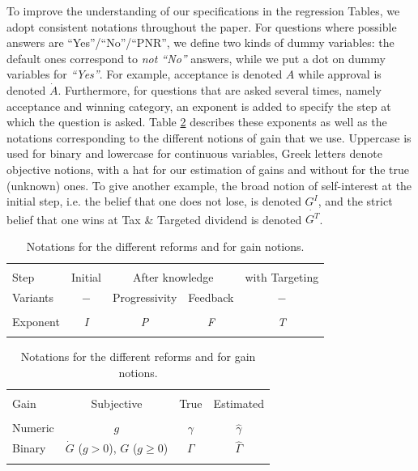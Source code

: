 \documentclass[11pt]{article}
\begin{document}
To improve the understanding of our specifications in the regression Tables, we adopt consistent notations throughout the paper. For questions where possible answers are ``Yes''/``No''/``PNR'', we define two kinds of dummy variables: the default ones correspond to \textit{not ``No''} answers, while we put a dot on dummy variables for \textit{``Yes''}. For example, acceptance is denoted $A$ while approval is denoted $\dot{A}$. Furthermore, for questions that are asked several times, namely acceptance and winning category, an exponent is added to specify the step at which the question is asked. Table \ref{tab:notations} describes these exponents as well as the notations corresponding to the different notions of gain that we use. Uppercase is used for binary and lowercase for continuous variables, Greek letters denote objective notions, with a hat for our estimation of gains and without for the true (unknown) ones. To give another example, the broad notion of self-interest at the initial step, i.e. the belief that one does not lose, is denoted $G^I$, and the strict belief that one wins at Tax \& Targeted dividend is denoted $\dot{G^T}$.


\begin{table}[H]
\caption{Notations for the different reforms and for gain notions.}
\label{tab:notations}

\centering \begin{tabular}{lcccc}
\\[-1.8ex]\hline 
\hline\\[-2.6ex] Step & Initial & \multicolumn{2}{c}{After knowledge} & with Targeting\tabularnewline

Variants & $-$ & Progressivity & Feedback & $-$\tabularnewline
 \hline \\[-2.3ex] 
Exponent & \emph{I} & \emph{P} & \emph{F} & \emph{T} \\ 
\hline 
\hline \\[-1.8ex] 
\end{tabular}

\medskip

\centering \begin{tabular}{lccc}
\\[-1.8ex]\hline 
\hline \\[-2.6ex] 
Gain & Subjective & True & Estimated\tabularnewline
 \hline \\[-2.3ex] 
Numeric & $g$ & $\gamma$ & $\widehat{\gamma}$\tabularnewline
Binary & $\dot{G}$ ($g>0$), $G$ ($g\geq0$) & $\Gamma$ & $\widehat{\Gamma}$ \\ 
\hline 
\hline \\[-1.8ex] 
\end{tabular}

\end{table}
\end{document}
